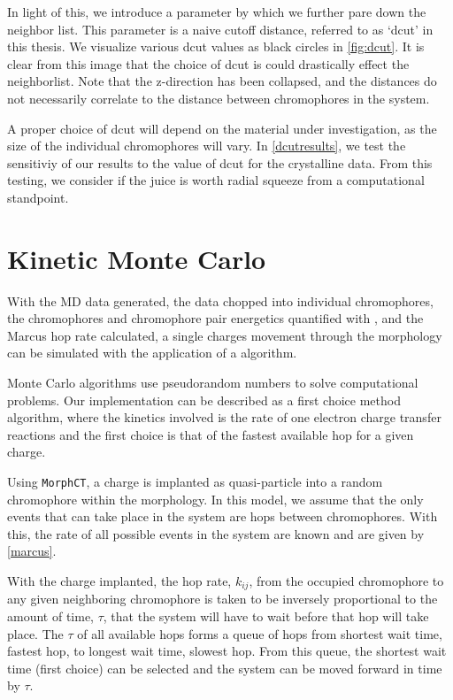 In light of this, we introduce a parameter by which we further pare down the neighbor list. This parameter is
a naive cutoff distance, referred to as `dcut' in this thesis. We visualize various dcut values as black
circles in \autoref{fig:dcut}.
It is clear from this image that the choice of dcut is could drastically effect the
neighborlist.  
Note that the z-direction has been collapsed, and the distances do not necessarily correlate to the distance
between chromophores in the system.

A proper choice of dcut will depend on the material under investigation, 
as the size of the individual chromophores will vary. In 
\autoref{dcutresults}, we test the sensitiviy of our results to the value of dcut for the crystalline 
data. From this testing, we consider if the juice is worth radial squeeze from a computational standpoint. 

\section{Kinetic Monte Carlo}
\label{KMC}

With the MD data generated, the data chopped into individual chromophores, 
the chromophores and chromophore pair energetics
quantified with , and the Marcus hop rate calculated, 
a single charges movement through the morphology can be simulated with the
application of a  algorithm.

Monte Carlo algorithms use pseudorandom numbers to solve computational problems. Our implementation can be
described as a first choice method  algorithm, where the kinetics involved is the rate of one electron
charge transfer reactions and the first choice is that of the fastest available hop for a given charge.

Using \texttt{MorphCT}, a charge is implanted as quasi-particle into a random chromophore within 
the morphology. In this model, we assume that the only events that can take place in the system are hops
between chromophores. With this, the rate of all possible events in the system are known and are given by
\autoref{marcus}. 

With the charge implanted, the hop rate, $k_{ij}$, from the occupied chromophore to any
given neighboring chromophore is taken to be
inversely proportional to the amount of time, $\tau$, that the system will have to wait before that hop will
take place. The $\tau$ of all available hops forms a queue of hops from shortest wait time, fastest hop, to
longest wait time, slowest hop. From this queue, the shortest wait time (first choice) can be selected
and the system can be moved forward in time by $\tau$.

